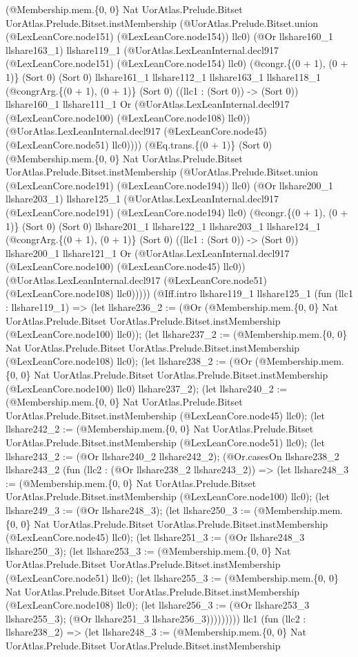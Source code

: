 \documentclass[11pt]{article}
\begin{document}
(@Membership.mem.\{0, 0\} Nat UorAtlas.Prelude.Bitset UorAtlas.Prelude.Bitset.instMembership (@UorAtlas.Prelude.Bitset.union (@LexLeanCore.node151) (@LexLeanCore.node154)) llc0) (@Or llshare160\_1 llshare163\_1) llshare119\_1 (@UorAtlas.LexLeanInternal.decl917 (@LexLeanCore.node151) (@LexLeanCore.node154) llc0) (@congr.\{(0 + 1), (0 + 1)\} (Sort 0) (Sort 0) llshare161\_1 llshare112\_1 llshare163\_1 llshare118\_1 (@congrArg.\{(0 + 1), (0 + 1)\} (Sort 0) ((llc1 : (Sort 0)) -> (Sort 0)) llshare160\_1 llshare111\_1 Or (@UorAtlas.LexLeanInternal.decl917 (@LexLeanCore.node100) (@LexLeanCore.node108) llc0)) (@UorAtlas.LexLeanInternal.decl917 (@LexLeanCore.node45) (@LexLeanCore.node51) llc0)))) (@Eq.trans.\{(0 + 1)\} (Sort 0) (@Membership.mem.\{0, 0\} Nat UorAtlas.Prelude.Bitset UorAtlas.Prelude.Bitset.instMembership (@UorAtlas.Prelude.Bitset.union (@LexLeanCore.node191) (@LexLeanCore.node194)) llc0) (@Or llshare200\_1 llshare203\_1) llshare125\_1 (@UorAtlas.LexLeanInternal.decl917 (@LexLeanCore.node191) (@LexLeanCore.node194) llc0) (@congr.\{(0 + 1), (0 + 1)\} (Sort 0) (Sort 0) llshare201\_1 llshare122\_1 llshare203\_1 llshare124\_1 (@congrArg.\{(0 + 1), (0 + 1)\} (Sort 0) ((llc1 : (Sort 0)) -> (Sort 0)) llshare200\_1 llshare121\_1 Or (@UorAtlas.LexLeanInternal.decl917 (@LexLeanCore.node100) (@LexLeanCore.node45) llc0)) (@UorAtlas.LexLeanInternal.decl917 (@LexLeanCore.node51) (@LexLeanCore.node108) llc0))))) (@Iff.intro llshare119\_1 llshare125\_1 (fun (llc1 : llshare119\_1) => (let llshare236\_2 := (@Or (@Membership.mem.\{0, 0\} Nat UorAtlas.Prelude.Bitset UorAtlas.Prelude.Bitset.instMembership (@LexLeanCore.node100) llc0)); (let llshare237\_2 := (@Membership.mem.\{0, 0\} Nat UorAtlas.Prelude.Bitset UorAtlas.Prelude.Bitset.instMembership (@LexLeanCore.node108) llc0); (let llshare238\_2 := (@Or (@Membership.mem.\{0, 0\} Nat UorAtlas.Prelude.Bitset UorAtlas.Prelude.Bitset.instMembership (@LexLeanCore.node100) llc0) llshare237\_2); (let llshare240\_2 := (@Membership.mem.\{0, 0\} Nat UorAtlas.Prelude.Bitset UorAtlas.Prelude.Bitset.instMembership (@LexLeanCore.node45) llc0); (let llshare242\_2 := (@Membership.mem.\{0, 0\} Nat UorAtlas.Prelude.Bitset UorAtlas.Prelude.Bitset.instMembership (@LexLeanCore.node51) llc0); (let llshare243\_2 := (@Or llshare240\_2 llshare242\_2); (@Or.casesOn llshare238\_2 llshare243\_2 (fun (llc2 : (@Or llshare238\_2 llshare243\_2)) => (let llshare248\_3 := (@Membership.mem.\{0, 0\} Nat UorAtlas.Prelude.Bitset UorAtlas.Prelude.Bitset.instMembership (@LexLeanCore.node100) llc0); (let llshare249\_3 := (@Or llshare248\_3); (let llshare250\_3 := (@Membership.mem.\{0, 0\} Nat UorAtlas.Prelude.Bitset UorAtlas.Prelude.Bitset.instMembership (@LexLeanCore.node45) llc0); (let llshare251\_3 := (@Or llshare248\_3 llshare250\_3); (let llshare253\_3 := (@Membership.mem.\{0, 0\} Nat UorAtlas.Prelude.Bitset UorAtlas.Prelude.Bitset.instMembership (@LexLeanCore.node51) llc0); (let llshare255\_3 := (@Membership.mem.\{0, 0\} Nat UorAtlas.Prelude.Bitset UorAtlas.Prelude.Bitset.instMembership (@LexLeanCore.node108) llc0); (let llshare256\_3 := (@Or llshare253\_3 llshare255\_3); (@Or llshare251\_3 llshare256\_3))))))))) llc1 (fun (llc2 : llshare238\_2) => (let llshare248\_3 := (@Membership.mem.\{0, 0\} Nat UorAtlas.Prelude.Bitset UorAtlas.Prelude.Bitset.instMembership 
\end{document}
